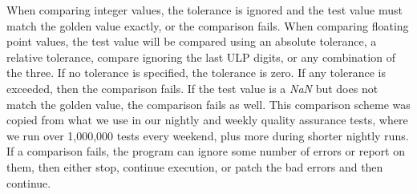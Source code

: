 When comparing integer values, the tolerance is ignored and the test value must match the golden value exactly, or the comparison fails.
When comparing floating point values, the test value will be compared using an absolute tolerance, a relative tolerance, compare ignoring the last ULP digits, or any combination of the three.
If no tolerance is specified, the tolerance is zero.
If any tolerance is exceeded, then the comparison fails.
If the test value is a \emph{NaN} but does not match the golden value, the comparison fails as well.
This comparison scheme was copied from what we use in our nightly and weekly quality assurance tests, where we run over 1,000,000 tests every weekend, plus more during shorter nightly runs.
If a comparison fails, the program can ignore some number of errors or report on them, then either stop, continue execution, or patch the bad errors and then continue.
